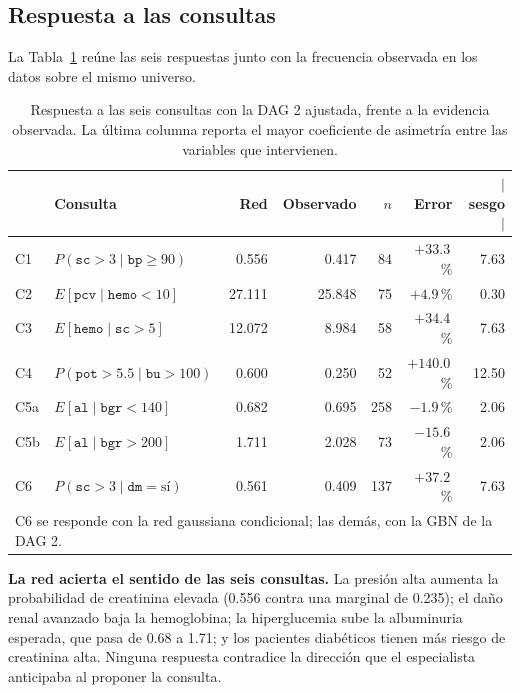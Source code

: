 \documentclass[11pt, a4paper]{article}
\begin{document}
\subsection{Respuesta a las consultas}

La Tabla~\ref{tab:consultas} reúne las seis respuestas junto con la frecuencia observada en los
datos sobre el mismo universo.

\begin{table}[htbp]
\centering
\caption{Respuesta a las seis consultas con la DAG 2 ajustada, frente a la evidencia observada.
La última columna reporta el mayor coeficiente de asimetría entre las variables que intervienen.}
\label{tab:consultas}
\small
\setlength{\tabcolsep}{5pt}
\renewcommand{\arraystretch}{1.15}
\begin{tabular}{l l r r r r r}
\toprule
& \textbf{Consulta} & \textbf{Red} & \textbf{Observado} & \textbf{$n$} &
\textbf{Error} & \textbf{$|$sesgo$|$} \\
\midrule
C1 & $P(\texttt{sc} > 3 \mid \texttt{bp} \geq 90)$        & 0.556  & 0.417  & 84  & $+33.3$\,\%  & 7.63 \\
C2 & $E[\texttt{pcv} \mid \texttt{hemo} < 10]$            & 27.111 & 25.848 & 75  & $+4.9$\,\%   & 0.30 \\
C3 & $E[\texttt{hemo} \mid \texttt{sc} > 5]$              & 12.072 & 8.984  & 58  & $+34.4$\,\%  & 7.63 \\
C4 & $P(\texttt{pot} > 5.5 \mid \texttt{bu} > 100)$       & 0.600  & 0.250  & 52  & $+140.0$\,\% & 12.50 \\
C5a& $E[\texttt{al} \mid \texttt{bgr} < 140]$             & 0.682  & 0.695  & 258 & $-1.9$\,\%   & 2.06 \\
C5b& $E[\texttt{al} \mid \texttt{bgr} > 200]$             & 1.711  & 2.028  & 73  & $-15.6$\,\%  & 2.06 \\
C6 & $P(\texttt{sc} > 3 \mid \texttt{dm} = \text{sí})$    & 0.561  & 0.409  & 137 & $+37.2$\,\%  & 7.63 \\
\bottomrule
\multicolumn{7}{l}{\footnotesize C6 se responde con la red gaussiana condicional; las demás, con la
GBN de la DAG 2.}\\
\end{tabular}
\end{table}

\textbf{La red acierta el sentido de las seis consultas.} La presión alta aumenta la probabilidad
de creatinina elevada (0.556 contra una marginal de 0.235); el daño renal avanzado baja la
hemoglobina; la hiperglucemia sube la albuminuria esperada, que pasa de 0.68 a 1.71; y los
pacientes diabéticos tienen más riesgo de creatinina alta. Ninguna respuesta contradice la
dirección que el especialista anticipaba al proponer la consulta.
\end{document}
